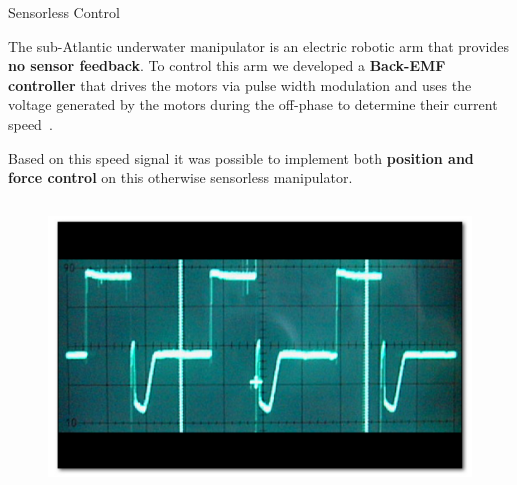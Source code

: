 


\begin{frame}{Sensorless Control}

\justifying

\vspace{1em}
The sub-Atlantic underwater manipulator is an electric robotic arm that provides
{\bf no sensor feedback}. To control this arm we developed a {\bf Back-EMF 
controller} that drives the motors via pulse width modulation and uses the 
voltage generated by the motors during the off-phase to determine their current 
speed~\cite{kerdels2008b}.

\vspace{1em}
Based on this speed signal it was possible to implement both {\bf position and 
force control} on this otherwise sensorless manipulator.


\begin{columns}[t]
\begin{column}{0.34\textwidth}
\begin{figure}
{
\hspace{-0.75em}
\includegraphics[width=\linewidth]{sensorless/scope.jpg}
}


\end{figure}
\end{column}
\end{columns}
\end{frame}
